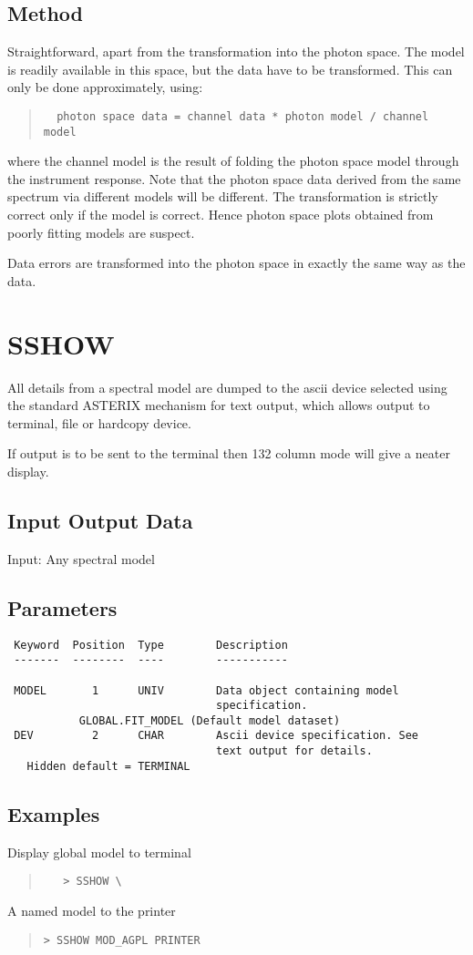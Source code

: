 \documentclass{book}
\renewcommand{\_}{{\tt\char'137}}     %
\begin{document}
\subsection{Method}
Straightforward, apart from the transformation into the photon
space. The model is readily available in this space, but the data
have to be transformed. This can only be done approximately,
using:
\begin{quote}\begin{verbatim}
  photon space data = channel data * photon model / channel model
\end{verbatim}\end{quote}
where the channel model is the result of folding the photon space
model through the instrument response. Note that the photon space
data derived from the same spectrum via different models will be
different. The transformation is strictly correct only if the
model is correct. Hence photon space plots obtained from poorly
fitting models are suspect.
 
Data errors are transformed into the photon space in exactly the
same way as the data.
 
\section{SSHOW}
All details from a spectral model are dumped to the ascii
device selected using the standard ASTERIX mechanism for
text output, which allows output to terminal, file or
hardcopy device.
 
If output is to be sent to the terminal then 132 column
mode will give a neater display.
 
\subsection{Input Output Data}
Input: Any spectral model
\subsection{Parameters}
\begin{verbatim}
 Keyword  Position  Type        Description
 -------  --------  ----        -----------
 
 MODEL       1      UNIV        Data object containing model
                                specification.
           GLOBAL.FIT_MODEL (Default model dataset)
 DEV         2      CHAR        Ascii device specification. See
                                text output for details.
   Hidden default = TERMINAL
\end{verbatim}\subsection{Examples}
Display global model to terminal
\begin{quote}\begin{verbatim}
   > SSHOW \
\end{verbatim}\end{quote}
A named model to the printer
\begin{quote}\begin{verbatim}
> SSHOW MOD_AGPL PRINTER
\end{verbatim}\end{quote}
\end{document}
